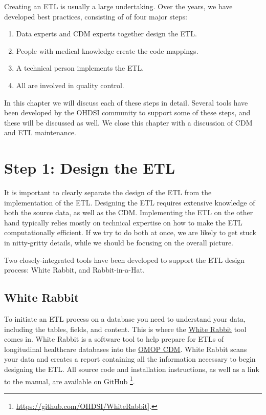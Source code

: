 \documentclass[11pt]{book}
\providecommand{\tightlist}{%
  \setlength{\itemsep}{0pt}\setlength{\parskip}{0pt}}
\let\rmarkdownfootnote\footnote%
\def\footnote{\protect\rmarkdownfootnote}
\theoremstyle{definition}
\theoremstyle{definition}
\theoremstyle{definition}
\theoremstyle{remark}
\begin{document}
Creating an ETL is usually a large undertaking. Over the years, we have developed best practices, consisting of of four major steps:

\begin{enumerate}
\def\labelenumi{\arabic{enumi}.}
\tightlist
\item
  Data experts and CDM experts together design the ETL.
\item
  People with medical knowledge create the code mappings.
\item
  A technical person implements the ETL.
\item
  All are involved in quality control.
\end{enumerate}

In this chapter we will discuss each of these steps in detail. Several tools have been developed by the OHDSI community to support some of these steps, and these will be discussed as well. We close this chapter with a discussion of CDM and ETL maintenance.

\hypertarget{step-1-design-the-etl}{%
\section{Step 1: Design the ETL}\label{step-1-design-the-etl}}

It is important to clearly separate the design of the ETL from the implementation of the ETL. Designing the ETL requires extensive knowledge of both the source data, as well as the CDM. Implementing the ETL on the other hand typically relies mostly on technical expertise on how to make the ETL computationally efficient. If we try to do both at once, we are likely to get stuck in nitty-gritty details, while we should be focusing on the overall picture.

Two closely-integrated tools have been developed to support the ETL design process: White Rabbit, and Rabbit-in-a-Hat.

\hypertarget{white-rabbit}{%
\subsection{White Rabbit}\label{white-rabbit}}

To initiate an ETL process on a database you need to understand your data, including the tables, fields, and content. This is where the \href{https://github.com/OHDSI/WhiteRabbit}{White Rabbit} tool comes in. White Rabbit is a software tool to help prepare for ETLs of longitudinal healthcare databases into the \href{https://github.com/OHDSI/CommonDataModel}{OMOP CDM}. White Rabbit scans your data and creates a report containing all the information necessary to begin designing the ETL. All source code and installation instructions, as well as a link to the manual, are available on GitHub \footnote{\url{https://github.com/OHDSI/WhiteRabbit}{]}.}.  
\end{document}
